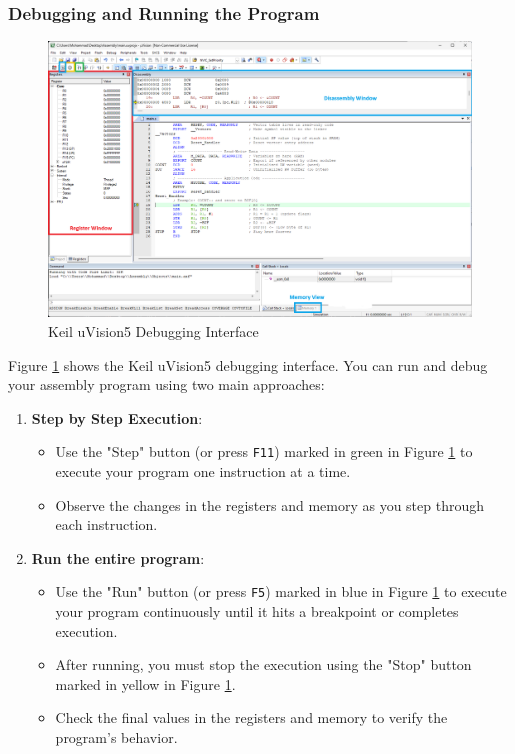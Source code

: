 \subsubsection{Debugging and Running the Program}
\begin{figure}[H]
    \centering
    \includegraphics[width=\textwidth]{resources/keil_debug.png}
    \caption{Keil uVision5 Debugging Interface}
    \label{fig:keil_debug}
\end{figure}
Figure \ref{fig:keil_debug} shows the Keil uVision5 debugging interface. You can run and debug your assembly program using two main approaches:
\begin{enumerate}[nosep]
    \item \textbf{Step by Step Execution}:
    \begin{itemize}[nosep]
        \item Use the "Step" button (or press \texttt{F11}) marked in green in Figure \ref{fig:keil_debug} to execute your program one instruction at a time.
        \item Observe the changes in the registers and memory as you step through each instruction.
    \end{itemize}
    \item \textbf{Run the entire program}:
    \begin{itemize}[nosep]
        \item Use the "Run" button (or press \texttt{F5}) marked in blue in Figure \ref{fig:keil_debug} to execute your program continuously until it hits a breakpoint or completes execution.
        \item After running, you must stop the execution using the "Stop" button marked in yellow in Figure \ref{fig:keil_debug}.
        \item Check the final values in the registers and memory to verify the program's behavior.
    \end{itemize}
\end{enumerate}
\newpage
